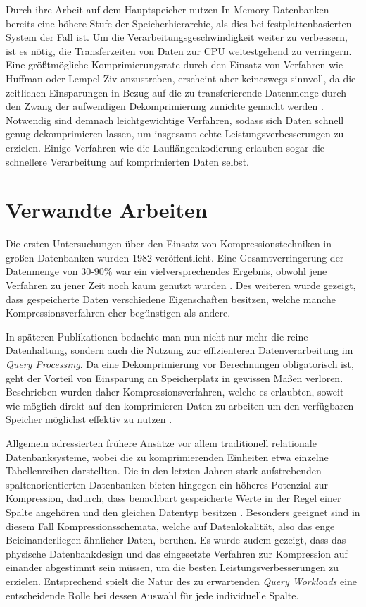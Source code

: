 Durch ihre Arbeit auf dem Hauptspeicher nutzen In-Memory Datenbanken bereits eine höhere Stufe der Speicherhierarchie, als dies bei festplattenbasierten System der Fall ist. Um die Verarbeitungsgeschwindigkeit weiter zu verbessern, ist es nötig, die Transferzeiten von Daten zur \ac{CPU} weitestgehend zu verringern. Eine größtmögliche Komprimierungsrate durch den Einsatz von Verfahren wie Huffman oder Lempel-Ziv anzustreben, erscheint aber keineswegs sinnvoll, da die zeitlichen Einsparungen in Bezug auf die zu transferierende Datenmenge durch den Zwang der aufwendigen Dekomprimierung zunichte gemacht werden \cite{Abadi2006}. Notwendig sind demnach leichtgewichtige Verfahren, sodass sich Daten schnell genug dekomprimieren lassen, um insgesamt echte Leistungsverbesserungen zu erzielen. Einige Verfahren wie die Lauflängenkodierung erlauben sogar die schnellere Verarbeitung auf komprimierten Daten selbst.

\section{Verwandte Arbeiten}

Die ersten Untersuchungen über den Einsatz von Kompressionstechniken in großen Datenbanken wurden 1982 veröffentlicht. Eine Gesamtverringerung der Datenmenge von 30-90\% war ein vielversprechendes Ergebnis, obwohl jene Verfahren zu jener Zeit noch kaum genutzt wurden \cite{Severance1982}. Des weiteren wurde gezeigt, dass gespeicherte Daten verschiedene Eigenschaften besitzen, welche manche Kompressionsverfahren eher begünstigen als andere.

In späteren Publikationen bedachte man nun nicht nur mehr die reine Datenhaltung, sondern auch die Nutzung zur effizienteren Datenverarbeitung im \textit{Query Processing}. Da eine Dekomprimierung vor Berechnungen obligatorisch ist, geht der Vorteil von Einsparung an Speicherplatz in gewissen Maßen verloren. Beschrieben wurden daher Kompressionsverfahren, welche es erlaubten, soweit wie möglich direkt auf den komprimieren Daten zu arbeiten um den verfügbaren Speicher möglichst effektiv zu nutzen \cite{Graefe1991}.

Allgemein adressierten frühere Ansätze vor allem traditionell relationale Datenbanksysteme, wobei die zu komprimierenden Einheiten etwa einzelne Tabellenreihen darstellten. Die in den letzten Jahren stark aufstrebenden spaltenorientierten Datenbanken bieten hingegen ein höheres Potenzial zur Kompression, dadurch, dass benachbart gespeicherte Werte in der Regel einer Spalte angehören und den gleichen Datentyp besitzen \cite{Abadi2006}. Besonders geeignet sind in diesem Fall Kompressionsschemata, welche auf Datenlokalität, also das enge Beieinanderliegen ähnlicher Daten, beruhen. Es wurde zudem gezeigt, dass das physische Datenbankdesign und das eingesetzte Verfahren zur Kompression auf einander abgestimmt sein müssen, um die besten Leistungsverbesserungen zu erzielen. Entsprechend spielt die Natur des zu erwartenden \textit{Query Workloads} eine entscheidende Rolle bei dessen Auswahl für jede individuelle Spalte.

